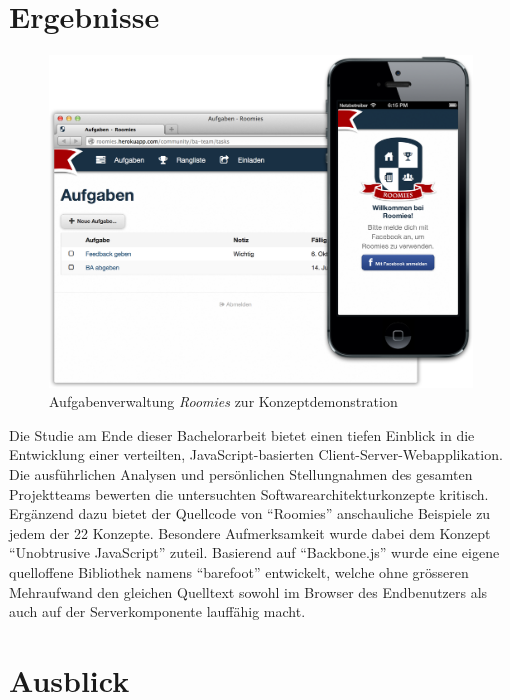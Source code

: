 \section{Ergebnisse}
\begin{figure}[H]
	\centering
	\includegraphics[width=12cm]{content/images/roomies-ui.png}
	\caption{Aufgabenverwaltung \emph{Roomies} zur Konzeptdemonstration}
\end{figure}

Die Studie am Ende dieser Bachelorarbeit bietet einen tiefen Einblick in die Entwicklung einer verteilten, JavaScript-basierten Client-Server-Webapplikation. Die ausführlichen Analysen und persönlichen Stellungnahmen des gesamten Projektteams bewerten die untersuchten Softwarearchitekturkonzepte kritisch. Ergänzend dazu bietet der Quellcode von ``Roomies'' anschauliche Beispiele zu jedem der 22 Konzepte. Besondere Aufmerksamkeit wurde dabei dem Konzept ``Unobtrusive JavaScript'' zuteil. Basierend auf ``Backbone.js'' wurde eine eigene quelloffene Bibliothek namens ``barefoot'' entwickelt, welche ohne grösseren Mehraufwand den gleichen Quelltext sowohl im Browser des Endbenutzers als auch auf der Serverkomponente lauffähig macht.

\section{Ausblick}